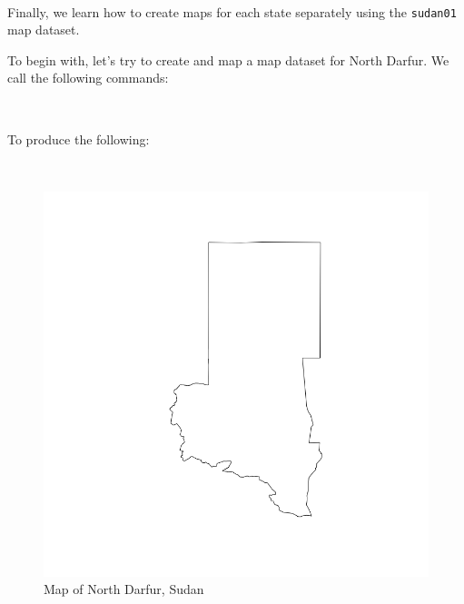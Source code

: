 \documentclass[12pt,a4paper,a4paper]{book}
\newenvironment{Shaded}{\begin{snugshade}}{\end{snugshade}}
\newcommand{\KeywordTok}[1]{\textcolor[rgb]{0.13,0.29,0.53}{\textbf{#1}}}
\newcommand{\StringTok}[1]{\textcolor[rgb]{0.31,0.60,0.02}{#1}}
\newcommand{\OperatorTok}[1]{\textcolor[rgb]{0.81,0.36,0.00}{\textbf{#1}}}
\newcommand{\NormalTok}[1]{#1}
\theoremstyle{definition}
\theoremstyle{definition}
\theoremstyle{definition}
\theoremstyle{remark}
\begin{document}
~

Finally, we learn how to create maps for each state separately using the
\texttt{sudan01} map dataset.

To begin with, let's try to create and map a map dataset for North
Darfur. We call the following commands:

~

\begin{Shaded}
\end{Shaded}

\newpage

To produce the following:

~

\begin{figure}[H]

{\centering \includegraphics{figures/map12-1} 

}

\caption{Map of North Darfur, Sudan}\label{fig:map12}
\end{figure}
\end{document}

